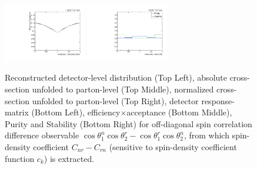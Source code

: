 \begin{figure}[htb]
\begin{center}
 \includegraphics[width=0.32\textwidth]{fig_fullRun2UL/unfolding/combined/TotEff_c_Mnr.pdf}
 \includegraphics[width=0.32\textwidth]{fig_fullRun2UL/unfolding/combined/PurStab_c_Mnr.pdf} \\
\caption{Reconstructed detector-level distribution (Top Left), absolute cross-section unfolded to parton-level (Top Middle), normalized cross-section unfolded to parton-level (Top Right), detector response-matrix (Bottom Left), efficiency$\times$acceptance (Bottom Middle), Purity and Stability (Bottom Right) for off-diagonal spin correlation difference observable $\cos\theta_{1}^{n}\cos\theta_{2}^{r}-\cos\theta_{1}^{r}\cos\theta_{2}^{n}$, from which spin-density coefficient $C_{nr}-C_{rn}$ (sensitive to spin-density coefficient function $c_k$) is extracted.}
\label{fig:c_Mnr}
\end{center}
\end{figure}
\clearpage
